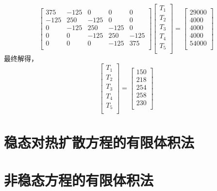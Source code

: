\begin{equation}
  \begin{bmatrix}
    375 & -125 & 0 & 0 & 0 \\
    -125 & 250 & -125 & 0 & 0  \\
    0 & -125 & 250 & -125 & 0   \\
    0 & 0 & -125 & 250 & -125  \\
    0 & 0 & 0 & -125 & 375 \\
  \end{bmatrix}
  \begin{bmatrix}
    T_{1} \\
    T_{2} \\
    T_{3} \\
    T_{4} \\
    T_{5} \\
  \end{bmatrix}
  =
  \begin{bmatrix}
    29000 \\
    4000 \\
    4000 \\
    4000 \\
    54000 \\
  \end{bmatrix}
\end{equation}
最终解得，
\begin{equation}
  \begin{bmatrix}
    T_{1} \\
    T_{2} \\
    T_{3} \\
    T_{4} \\
    T_{5} \\
  \end{bmatrix}
=
  \begin{bmatrix}
    150 \\
    218 \\
    254 \\
    258 \\
    230 \\
  \end{bmatrix}
\end{equation}


\section{稳态对热扩散方程的有限体积法}

\section{非稳态方程的有限体积法}

